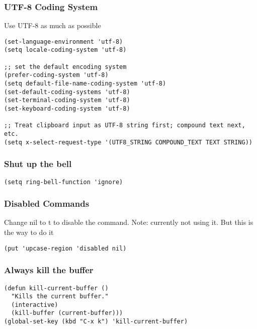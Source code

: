 \documentclass[11pt]{article}
\begin{document}
\subsubsection{UTF-8 Coding System}
\label{sec:org3bfa627}
Use UTF-8 as much as possible
\begin{verbatim}
(set-language-environment 'utf-8)                                                           
(setq locale-coding-system 'utf-8)                                                          

;; set the default encoding system                                                          
(prefer-coding-system 'utf-8)                                                               
(setq default-file-name-coding-system 'utf-8)                                               
(set-default-coding-systems 'utf-8)                                                         
(set-terminal-coding-system 'utf-8)                                                         
(set-keyboard-coding-system 'utf-8)                                                         

;; Treat clipboard input as UTF-8 string first; compound text next, etc.                    
(setq x-select-request-type '(UTF8_STRING COMPOUND_TEXT TEXT STRING)) 
\end{verbatim}
\subsubsection{Shut up the bell}
\label{sec:org5537b26}
\begin{verbatim}
(setq ring-bell-function 'ignore) 
\end{verbatim}

\subsubsection{Disabled Commands}
\label{sec:org96ff7e4}
Change nil to t to disable the command. 
Note: currently not using it. But this is the way to do it
\begin{verbatim}
(put 'upcase-region 'disabled nil) 
\end{verbatim}

\subsubsection{Always kill the buffer}
\label{sec:org0200d77}
\begin{verbatim}
(defun kill-current-buffer ()
  "Kills the current buffer."
  (interactive)
  (kill-buffer (current-buffer)))
(global-set-key (kbd "C-x k") 'kill-current-buffer)
\end{verbatim}
\end{document}
